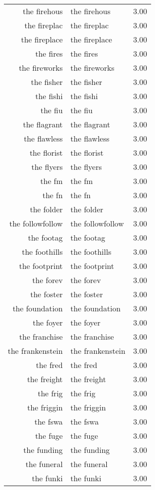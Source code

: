 \begin{table}[ht]
\begin{tabular}{rlr}
  the firehous & the firehous & 3.00 \\ 
  the fireplac & the fireplac & 3.00 \\ 
  the fireplace & the fireplace & 3.00 \\ 
  the fires & the fires & 3.00 \\ 
  the fireworks & the fireworks & 3.00 \\ 
  the fisher & the fisher & 3.00 \\ 
  the fishi & the fishi & 3.00 \\ 
  the fiu & the fiu & 3.00 \\ 
  the flagrant & the flagrant & 3.00 \\ 
  the flawless & the flawless & 3.00 \\ 
  the florist & the florist & 3.00 \\ 
  the flyers & the flyers & 3.00 \\ 
  the fm & the fm & 3.00 \\ 
  the fn & the fn & 3.00 \\ 
  the folder & the folder & 3.00 \\ 
  the followfollow & the followfollow & 3.00 \\ 
  the footag & the footag & 3.00 \\ 
  the foothills & the foothills & 3.00 \\ 
  the footprint & the footprint & 3.00 \\ 
  the forev & the forev & 3.00 \\ 
  the foster & the foster & 3.00 \\ 
  the foundation & the foundation & 3.00 \\ 
  the foyer & the foyer & 3.00 \\ 
  the franchise & the franchise & 3.00 \\ 
  the frankenstein & the frankenstein & 3.00 \\ 
  the fred & the fred & 3.00 \\ 
  the freight & the freight & 3.00 \\ 
  the frig & the frig & 3.00 \\ 
  the friggin & the friggin & 3.00 \\ 
  the fswa & the fswa & 3.00 \\ 
  the fuge & the fuge & 3.00 \\ 
  the funding & the funding & 3.00 \\ 
  the funeral & the funeral & 3.00 \\ 
  the funki & the funki & 3.00 \\ 

\end{tabular}
\end{table}
